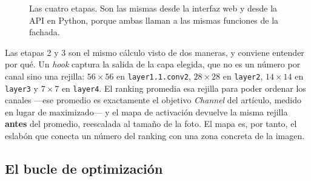 \documentclass[11pt,a4paper]{article}
\begin{document}
\begin{figure}[htb]
\centering
{}
\caption{Las cuatro etapas. Son las mismas desde la interfaz web y desde la
API en Python, porque ambas llaman a las mismas funciones de la fachada.}
\label{fig:recorrido}
\end{figure}

Las etapas 2 y 3 son el mismo cálculo visto de dos maneras, y conviene
entender por qué. Un \emph{hook} captura la salida de la capa elegida, que
no es un número por canal sino una rejilla: $56\times56$ en
\texttt{layer1.1.conv2}, $28\times28$ en \texttt{layer2}, $14\times14$ en
\texttt{layer3} y $7\times7$ en \texttt{layer4}. El ranking promedia esa
rejilla para poder ordenar los canales —ese promedio es exactamente el
objetivo \emph{Channel} del artículo, medido en lugar de maximizado— y el
mapa de activación devuelve la misma rejilla \textbf{antes} del promedio,
reescalada al tamaño de la foto. El mapa es, por tanto, el eslabón que
conecta un número del ranking con una zona concreta de la imagen.

\subsection{El bucle de optimización}
\end{document}
